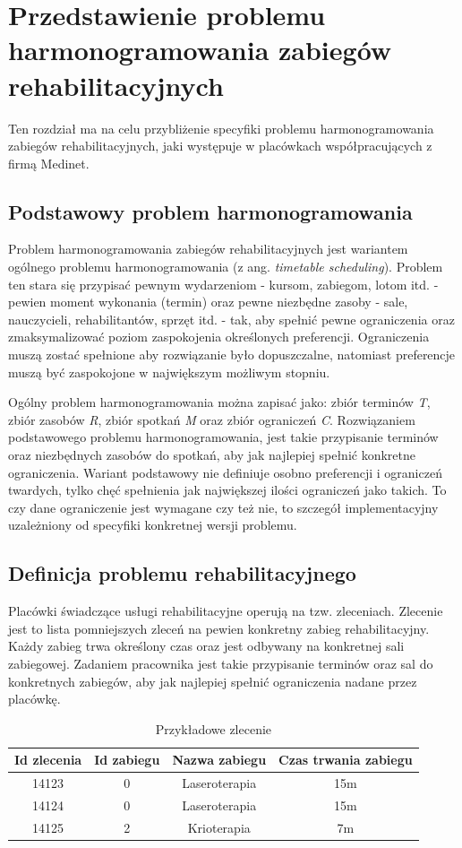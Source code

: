 \chapter{Przedstawienie problemu harmonogramowania zabiegów rehabilitacyjnych}
Ten rozdział ma na celu przybliżenie specyfiki problemu harmonogramowania zabiegów
rehabilitacyjnych, jaki występuje w placówkach współpracujących z firmą Medinet.

\section{Podstawowy problem harmonogramowania}
Problem harmonogramowania zabiegów rehabilitacyjnych jest wariantem ogólnego problemu
harmonogramowania (z ang. \emph{timetable scheduling}). Problem ten  stara się
przypisać pewnym wydarzeniom - kursom, zabiegom, lotom itd. - pewien moment
wykonania (termin) oraz pewne niezbędne zasoby - sale, nauczycieli,
rehabilitantów, sprzęt itd. - tak, aby spełnić pewne ograniczenia oraz
zmaksymalizować poziom zaspokojenia określonych preferencji. Ograniczenia muszą
zostać spełnione aby rozwiązanie było dopuszczalne, natomiast preferencje muszą
być zaspokojone w największym możliwym stopniu.

Ogólny problem harmonogramowania można zapisać \cite{habib2013} jako:
zbiór terminów \emph{T}, zbiór zasobów \emph{R}, zbiór spotkań \emph{M} oraz
zbiór ograniczeń \emph{C}. Rozwiązaniem podstawowego problemu harmonogramowania,
jest takie przypisanie terminów oraz niezbędnych zasobów do spotkań, aby jak
najlepiej spełnić konkretne ograniczenia. Wariant podstawowy nie definiuje
osobno preferencji i ograniczeń twardych, tylko chęć spełnienia jak największej ilości ograniczeń
jako takich. To czy dane ograniczenie jest wymagane czy też nie, to szczegół
implementacyjny uzależniony od specyfiki konkretnej wersji problemu.
\pagebreak
\section{Definicja problemu rehabilitacyjnego}
\label{problem-definition}
Placówki świadczące usługi rehabilitacyjne operują na tzw. zleceniach. Zlecenie
jest to lista pomniejszych zleceń na pewien konkretny zabieg rehabilitacyjny.
Każdy zabieg trwa określony czas oraz jest odbywany na konkretnej sali
zabiegowej. Zadaniem pracownika jest takie przypisanie terminów oraz sal do konkretnych
zabiegów, aby jak najlepiej spełnić ograniczenia nadane przez placówkę.

\begin{table}[h]
	\centering
	\begin{tabular}{ | c | c | c | c | }
		\hline
	\bfseries Id zlecenia & \bfseries Id zabiegu & \bfseries Nazwa zabiegu & \bfseries Czas trwania zabiegu \\
	\hline
	14123 & 0 & Laseroterapia & 15m \\
		\hline
	14124 & 0 & Laseroterapia & 15m \\
		\hline
	14125 & 2 & Krioterapia & 7m \\
		\hline
	\end{tabular}
	\caption{Przykładowe zlecenie}
	\label{example-referral}
\end{table}


